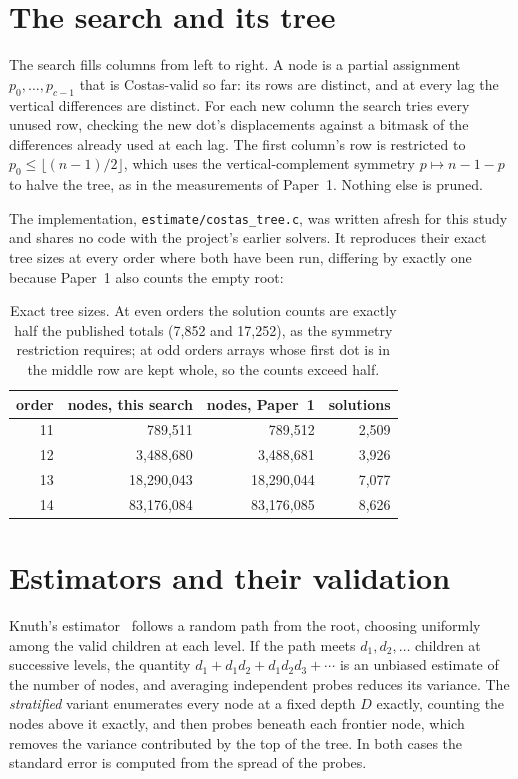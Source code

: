 \section{The search and its tree}
\label{sec:tree}
The search fills columns from left to right. A node is a partial assignment $p_0,\dots,p_{c-1}$ that is
Costas-valid so far: its rows are distinct, and at every lag the vertical differences are distinct. For
each new column the search tries every unused row, checking the new dot's displacements against a
bitmask of the differences already used at each lag. The first column's row is restricted to
$p_0\le\lfloor(n-1)/2\rfloor$, which uses the vertical-complement symmetry $p\mapsto n-1-p$ to halve the
tree, as in the measurements of Paper~1. Nothing else is pruned.

The implementation, \texttt{estimate/costas\_tree.c}, was written afresh for this study and shares no code
with the project's earlier solvers. It reproduces their exact tree sizes at every order where both have
been run, differing by exactly one because Paper~1 also counts the empty root:

\begin{table}[H]
\centering
\small
\begin{tabular}{@{}rrrr@{}}
\toprule
order & nodes, this search & nodes, Paper~1 & solutions \\
\midrule
11 & 789{,}511 & 789{,}512 & 2{,}509 \\
12 & 3{,}488{,}680 & 3{,}488{,}681 & 3{,}926 \\
13 & 18{,}290{,}043 & 18{,}290{,}044 & 7{,}077 \\
14 & 83{,}176{,}084 & 83{,}176{,}085 & 8{,}626 \\
\bottomrule
\end{tabular}
\caption{Exact tree sizes. At even orders the solution counts are exactly half the published totals
(7{,}852 and 17{,}252), as the symmetry restriction requires; at odd orders arrays whose first dot is in
the middle row are kept whole, so the counts exceed half.}
\label{tab:exact}
\end{table}

\section{Estimators and their validation}
\label{sec:validation}
Knuth's estimator~\cite{knuth1975} follows a random path from the root, choosing uniformly among the
valid children at each level. If the path meets $d_1,d_2,\dots$ children at successive levels, the
quantity $d_1+d_1d_2+d_1d_2d_3+\cdots$ is an unbiased estimate of the number of nodes, and averaging
independent probes reduces its variance. The \emph{stratified} variant enumerates every node at a fixed
depth $D$ exactly, counting the nodes above it exactly, and then probes beneath each frontier node,
which removes the variance contributed by the top of the tree. In both cases the standard error is
computed from the spread of the probes.

